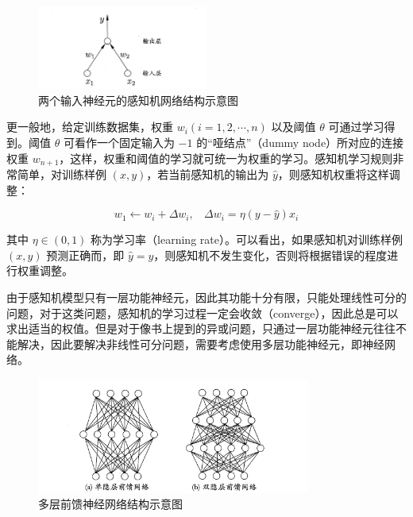 \documentclass[12pt, a4paper]{article} %
\begin{document}
\begin{figure}[H]
    \centering
    \includegraphics[width=0.5\textwidth]{../img/5-4-两个输入神经元的感知机网络结构示意图.png}
    \caption{两个输入神经元的感知机网络结构示意图}
    \label{fig:两个输入神经元的感知机网络结构示意图}
\end{figure}

更一般地，给定训练数据集，权重 $w_i(i = 1, 2, \cdots, n)$ 以及阈值 $\theta$ 可通过学习得到。阈值 $\theta$ 可看作一个固定输入为 $-1$ 的“哑结点”（dummy node）所对应的连接权重 $w_{n + 1}$，这样，权重和阈值的学习就可统一为权重的学习。感知机学习规则非常简单，对训练样例 $(x, y)$，若当前感知机的输出为 $\hat{y}$，则感知机权重将这样调整：

\begin{equation*}
    w_1 \leftarrow w_i + \Delta w_i, \ \ \ \ \Delta w_i = \eta (y - \hat{y}) x_i
\end{equation*}

其中 $\eta \in (0, 1)$ 称为学习率（learning rate）。可以看出，如果感知机对训练样例 $(x, y)$ 预测正确而，即 $\hat{y} = y$，则感知机不发生变化，否则将根据错误的程度进行权重调整。

由于感知机模型只有一层功能神经元，因此其功能十分有限，只能处理线性可分的问题，对于这类问题，感知机的学习过程一定会收敛（converge），因此总是可以求出适当的权值。但是对于像书上提到的异或问题，只通过一层功能神经元往往不能解决，因此要解决非线性可分问题，需要考虑使用多层功能神经元，即神经网络。

\begin{figure}[H]
    \centering
    \includegraphics[width=0.8\textwidth]{../img/5-5-多层前馈神经网络结构示意图.png}
    \caption{多层前馈神经网络结构示意图}
    \label{fig:多层前馈神经网络结构示意图}
\end{figure}
\end{document}
